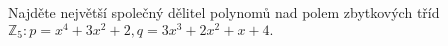 Najděte největší společný dělitel polynomů nad polem zbytkových tříd
$\mathbb{Z}_{5}:p=x^{4}+3x^{2}+2,q=3x^{3}+2x^{2}+x+4.$
